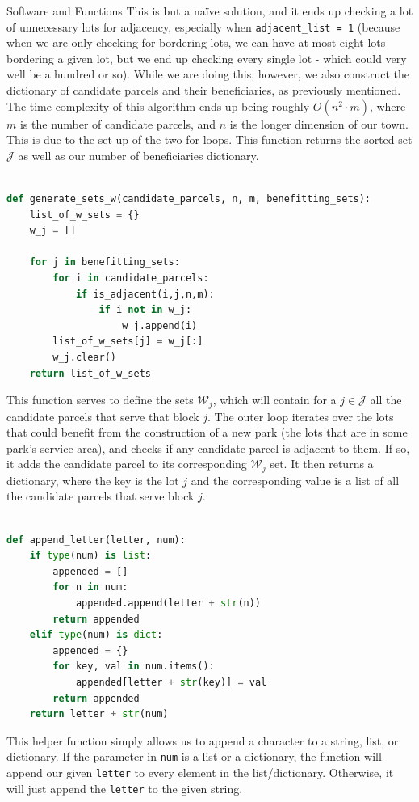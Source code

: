 \documentclass[12pt]{pom_thesis}
\theoremstyle{definition}
\begin{document}
\begin{chapter}{Software and Functions}
	This is but a na\"{i}ve solution, and it ends up checking a lot of unnecessary lots for adjacency, especially when \verb-adjacent_list = 1- (because when we are only checking for bordering lots, we can have at most eight lots bordering a given lot, but we end up checking every single lot - which could very well be a hundred or so). While we are doing this, however, we also construct the dictionary of candidate parcels and their beneficiaries, as previously mentioned. The time complexity of this algorithm ends up being roughly $O(n^2 \cdot m)$, where $m$ is the number of candidate parcels, and $n$ is the longer dimension of our town. This is due to the set-up of the two for-loops. This function returns the sorted set $\mathcal{J}$ as well as our number of beneficiaries dictionary.\\ \\
%
\begin{lstlisting}[language = Python, caption = Generates the sets $\mathcal{W}_j$ for all $j \in \mathcal{J}$.]
def generate_sets_w(candidate_parcels, n, m, benefitting_sets):
	list_of_w_sets = {}
	w_j = []

	for j in benefitting_sets:
		for i in candidate_parcels:
			if is_adjacent(i,j,n,m):
				if i not in w_j:
					w_j.append(i)
		list_of_w_sets[j] = w_j[:]
		w_j.clear()
	return list_of_w_sets
\end{lstlisting}
This function serves to define the sets $\mathcal{W}_j$, which will contain for a $j \in \mathcal{J}$ all the candidate parcels that serve that block $j$. The outer loop iterates over the lots that could benefit from the construction of a new park (the lots that are in some park's service area), and checks if any candidate parcel is adjacent to them. If so, it adds the candidate parcel to its corresponding $\mathcal{W}_j$ set. It then returns a dictionary, where the key is the lot $j$ and the corresponding value is a list of all the candidate parcels that serve block $j$. \\ \\

\begin{lstlisting}[language = Python, caption = {Appends letter to strings, lists, or dictionaries.}]
def append_letter(letter, num):
	if type(num) is list:
		appended = []
		for n in num:
			appended.append(letter + str(n))
		return appended
	elif type(num) is dict:
		appended = {}
		for key, val in num.items():
			appended[letter + str(key)] = val	
		return appended
	return letter + str(num)
\end{lstlisting}
This helper function simply allows us to append a character to a string, list, or dictionary. If the parameter in \verb-num- is a list or a dictionary, the function will append our given \verb-letter- to every element in the list/dictionary. Otherwise, it will just append the \verb-letter- to the given string. \\ \\


\end{chapter}
\end{document}
